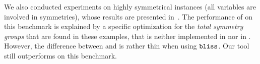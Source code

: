 \begin{table}[!htbp]
 \vspace*{0.1cm}
 \caption{Comparison of the number of generated SBPs each time \breakid{} and 
  \cdclsym{} both compute a verdict (number of verdicts between parentheses).}
 \label{tab:sbp}
\end{table}

We also conducted experiments on highly symmetrical instances (all variables
are involved in symmetries), whose results are presented
in~. The performance of \breakid{} on this benchmark is
explained by a specific optimization for the \emph{total symmetry groups} that
are found in these examples, that is neither implemented in \shatter{} nor in
\cdclsym{}. However, the difference between \breakid{} and \cdclsym{} is rather
thin when using $\texttt{bliss}{}$. Our tool still outperforms \shatter{} on this
benchmark.

